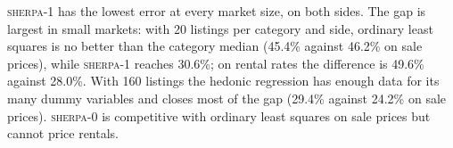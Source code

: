 \textsc{sherpa-1} has the lowest error at every market size, on both sides. The gap is largest in
small markets: with 20 listings per category and side, ordinary least squares is no better than the
category median (45.4\% against 46.2\% on sale prices), while \textsc{sherpa-1} reaches 30.6\%; on
rental rates the difference is 49.6\% against 28.0\%. With 160 listings the hedonic regression has
enough data for its many dummy variables and closes most of the gap (29.4\% against 24.2\% on sale
prices). \textsc{sherpa-0} is competitive with ordinary least squares on sale prices but cannot
price rentals.
